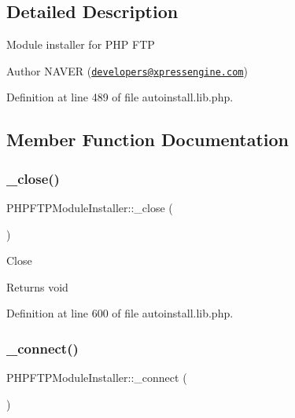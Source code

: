 \subsection{Detailed Description}
Module installer for P\+HP F\+TP \begin{DoxyAuthor}{Author}
N\+A\+V\+ER (\href{mailto:developers@xpressengine.com}{\tt developers@xpressengine.\+com}) 
\end{DoxyAuthor}


Definition at line 489 of file autoinstall.\+lib.\+php.



\subsection{Member Function Documentation}
\mbox{\label{classPHPFTPModuleInstaller_aa50f708fe4f367338fc95303e9425f83}} 
\subsubsection{\texorpdfstring{\+\_\+close()}{\_close()}}
{\footnotesize\ttfamily P\+H\+P\+F\+T\+P\+Module\+Installer\+::\+\_\+close (\begin{DoxyParamCaption}{ }\end{DoxyParamCaption})}

Close

\begin{DoxyReturn}{Returns}
void 
\end{DoxyReturn}


Definition at line 600 of file autoinstall.\+lib.\+php.

\mbox{\label{classPHPFTPModuleInstaller_a17bd035c8cc7030a56feedf6562de616}} 
\subsubsection{\texorpdfstring{\+\_\+connect()}{\_connect()}}
{\footnotesize\ttfamily P\+H\+P\+F\+T\+P\+Module\+Installer\+::\+\_\+connect (\begin{DoxyParamCaption}{ }\end{DoxyParamCaption})}

